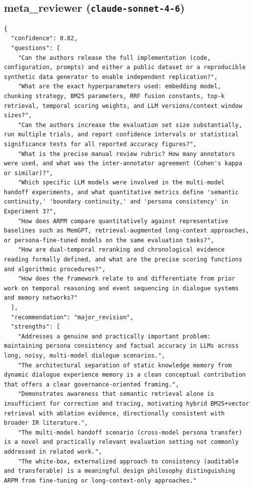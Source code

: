 \documentclass[11pt]{article}
\begin{document}
\subsection*{meta_reviewer (\texttt{claude-sonnet-4-6})}
\begin{verbatim}
{
  "confidence": 0.82,
  "questions": [
    "Can the authors release the full implementation (code, configuration, prompts) and either a public dataset or a reproducible synthetic data generator to enable independent replication?",
    "What are the exact hyperparameters used: embedding model, chunking strategy, BM25 parameters, RRF fusion constants, top-k retrieval, temporal scoring weights, and LLM versions/context window sizes?",
    "Can the authors increase the evaluation set size substantially, run multiple trials, and report confidence intervals or statistical significance tests for all reported accuracy figures?",
    "What is the precise manual review rubric? How many annotators were used, and what was the inter-annotator agreement (Cohen's kappa or similar)?",
    "Which specific LLM models were involved in the multi-model handoff experiments, and what quantitative metrics define 'semantic continuity,' 'boundary continuity,' and 'persona consistency' in Experiment 3?",
    "How does ARPM compare quantitatively against representative baselines such as MemGPT, retrieval-augmented long-context approaches, or persona-fine-tuned models on the same evaluation tasks?",
    "How are dual-temporal reranking and chronological evidence reading formally defined, and what are the precise scoring functions and algorithmic procedures?",
    "How does the framework relate to and differentiate from prior work on temporal reasoning and event sequencing in dialogue systems and memory networks?"
  ],
  "recommendation": "major_revision",
  "strengths": [
    "Addresses a genuine and practically important problem: maintaining persona consistency and factual accuracy in LLMs across long, noisy, multi-model dialogue scenarios.",
    "The architectural separation of static knowledge memory from dynamic dialogue experience memory is a clean conceptual contribution that offers a clear governance-oriented framing.",
    "Demonstrates awareness that semantic retrieval alone is insufficient for correction and tracing, motivating hybrid BM25+vector retrieval with ablation evidence, directionally consistent with broader IR literature.",
    "The multi-model handoff scenario (cross-model persona transfer) is a novel and practically relevant evaluation setting not commonly addressed in related work.",
    "The white-box, externalized approach to consistency (auditable and transferable) is a meaningful design philosophy distinguishing ARPM from fine-tuning or long-context-only approaches."

\end{verbatim}
\end{document}
